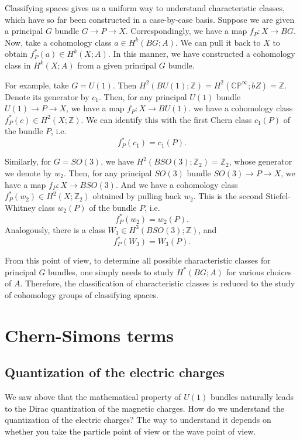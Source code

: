 \documentclass[12pt]{article}
\numberwithin{equation}{section}
\theoremstyle{remark}
\def\bZ{\mathbb{Z}}
\def\CP{\mathbb{CP}}
\begin{document}
Classifying spaces gives us a uniform way to understand characteristic classes,
which have so far been constructed in a case-by-case basis.
Suppose we are given a principal $G$ bundle $G\to P\to X$.
Correspondingly, we have a map $f_P:X\to BG$.
Now, take a cohomology class $a\in H^k(BG;A)$.
We can pull it back to $X$ to obtain $f_P^*(a)\in H^k(X;A)$.
In this manner, we have constructed a cohomology class in $H^k(X;A)$
from a given principal $G$ bundle.

For example, take $G=U(1)$.
Then $H^2(BU(1);\bZ)=H^2(\CP^\infty;bZ)=\bZ$.
Denote its generator by $c_1$.
Then, for any principal $U(1)$ bundle $U(1)\to P\to X$,
we have a map $f_P:X\to BU(1)$.
we have a cohomology class $f_P^*(c)\in H^2(X;\bZ)$.
We can identify this with the first Chern class $c_1(P)$ of the bundle $P$,
i.e.~\begin{equation}
f_P^*(c_1)=c_1(P).
\end{equation}

Similarly, for $G=SO(3)$, we have $H^2(BSO(3);\bZ_2)=\bZ_2$,
whose generator we denote by $w_2$.
Then, for any principal $SO(3)$ bundle $SO(3)\to P\to X$,
we have a map $f_P:X\to BSO(3)$.
And we have a cohomology class $f_P^*(w_2)\in H^2(X;\bZ_2)$
obtained by pulling back $w_2$.
This is the second Stiefel-Whitney class $w_2(P)$ of the bundle $P$,
i.e.~\begin{equation}
f_P^*(w_2)=w_2(P).
\end{equation}
Analogously, there is a class $W_3\in H^3(BSO(3);\bZ)$,
and \begin{equation}
f_P^*(W_3)=W_3(P).
\end{equation}

From this point of view, to determine all possible characteristic classes
for principal $G$ bundles,
one simply needs to study $H^*(BG;A)$ for various choices of $A$.
Therefore, the classification of characteristic classes
is reduced to the study of cohomology groups of classifying spaces.

\section{Chern-Simons terms}

\subsection{Quantization of the electric charges}
We saw above that the mathematical property of $U(1)$ bundles naturally leads to the Dirac quantization of the magnetic charges.
How do we understand the quantization of the electric charges? 
The way to understand it depends on whether you take the particle point of view or the wave point of view.
\end{document}
